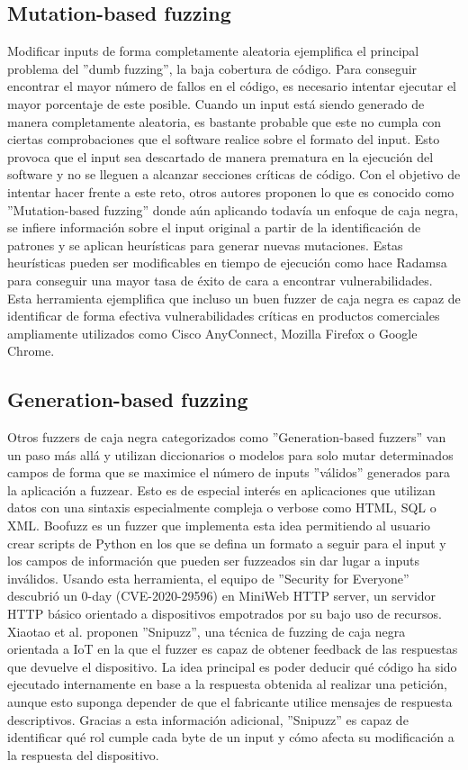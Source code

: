 \subsection{Mutation-based fuzzing}
Modificar inputs de forma completamente aleatoria
ejemplifica el principal problema del ''dumb fuzzing'', la baja cobertura de código. Para conseguir encontrar 
el mayor número de fallos en el código, es necesario intentar ejecutar el mayor porcentaje de este posible. Cuando 
un input está siendo generado de manera completamente aleatoria, es bastante probable que este no cumpla con
ciertas comprobaciones que el software realice sobre el formato del input. Esto provoca que el input sea descartado 
de manera prematura en la ejecución del software y no se lleguen a alcanzar secciones críticas de código.
Con el objetivo de intentar hacer frente a este reto, otros autores proponen lo que es 
conocido como ''Mutation-based fuzzing'' donde aún aplicando todavía un enfoque de caja negra, se infiere
información sobre el input original a partir de la identificación de patrones y se aplican heurísticas para generar
nuevas mutaciones. Estas heurísticas pueden ser modificables en tiempo de ejecución como hace Radamsa\cite{radamsa}
para conseguir una mayor tasa de éxito de cara a encontrar vulnerabilidades. Esta herramienta ejemplifica que incluso 
un buen fuzzer de caja negra es capaz de identificar de forma efectiva vulnerabilidades críticas en productos comerciales 
ampliamente utilizados como Cisco AnyConnect, Mozilla Firefox o Google Chrome.

\subsection{Generation-based fuzzing}
Otros fuzzers de caja negra categorizados como ''Generation-based fuzzers''\cite{Felderer2016} van un paso más allá y utilizan diccionarios o modelos para solo 
mutar determinados campos de forma que se maximice el número de inputs ''válidos'' generados para la aplicación a fuzzear. Esto es de 
especial interés en aplicaciones que utilizan datos con una sintaxis especialmente compleja o verbose como HTML, SQL o XML.
Boofuzz\cite{boofuzz} es un fuzzer que implementa esta idea permitiendo al usuario crear scripts de Python en los que 
se defina un formato a seguir para el input y los campos de información que pueden ser fuzzeados sin dar lugar a inputs 
inválidos. Usando esta herramienta, el equipo de ''Security for Everyone'' descubrió un 0-day (CVE-2020-29596)\cite{securityforeveryone}
en MiniWeb HTTP server, un servidor HTTP básico orientado a dispositivos empotrados por su bajo uso de recursos.
Xiaotao et al.\cite{snipuzz} proponen ''Snipuzz'', una técnica de fuzzing de caja negra orientada a IoT en la que el fuzzer es capaz de obtener feedback 
de las respuestas que devuelve el dispositivo. La idea principal es poder deducir qué código ha sido ejecutado internamente en base a 
la respuesta obtenida al realizar una petición, aunque esto suponga depender de que el fabricante utilice mensajes de respuesta descriptivos.
Gracias a esta información adicional, ''Snipuzz'' es capaz de identificar qué rol cumple cada 
byte de un input y cómo afecta su modificación a la respuesta del dispositivo.

